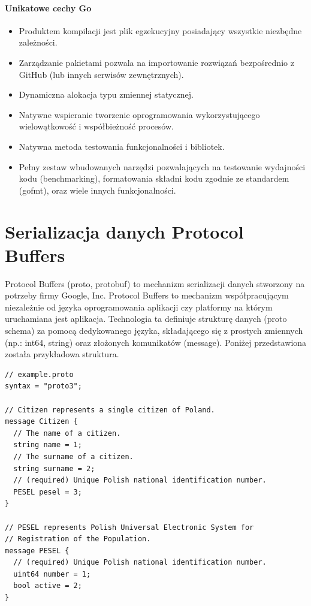\documentclass[a4paper,12pt,twoside,openany]{report}
\begin{document}
\paragraph{Unikatowe cechy Go}
\begin{itemize}
 \item Produktem kompilacji jest plik egzekucyjny posiadający wszystkie niezbędne zależności.
 \item Zarządzanie pakietami pozwala na importowanie rozwiązań bezpośrednio z GitHub (lub innych serwisów zewnętrznych).
 \item Dynamiczna alokacja typu zmiennej statycznej.
 \item Natywne wspieranie tworzenie oprogramowania wykorzystującego wielowątkowość i współbieżność procesów.
 \item Natywna metoda testowania funkcjonalności i bibliotek.
 \item Pełny zestaw wbudowanych narzędzi pozwalających na testowanie wydajności kodu (benchmarking), formatowania składni kodu zgodnie ze standardem (gofmt),
       oraz wiele innych funkcjonalności.
\end{itemize}

\section{Serializacja danych Protocol Buffers}
Protocol Buffers (proto, protobuf) to mechanizm serializacji danych stworzony na potrzeby firmy Google, Inc.
Protocol Buffers to mechanizm współpracującym niezależnie od języka oprogramowania aplikacji czy platformy na którym uruchamiana jest aplikacja.
Technologia ta definiuje strukturę danych (proto schema) za pomocą dedykowanego języka, składającego się z prostych zmiennych (np.: int64, string) 
oraz złożonych komunikatów (message). Poniżej przedstawiona została przykładowa struktura.

\begin{lstlisting}
// example.proto
syntax = "proto3";

// Citizen represents a single citizen of Poland.
message Citizen {
  // The name of a citizen.
  string name = 1;
  // The surname of a citizen.
  string surname = 2;
  // (required) Unique Polish national identification number.
  PESEL pesel = 3;
}

// PESEL represents Polish Universal Electronic System for
// Registration of the Population.
message PESEL {
  // (required) Unique Polish national identification number.
  uint64 number = 1;
  bool active = 2;
}
\end{lstlisting}
\end{document}
